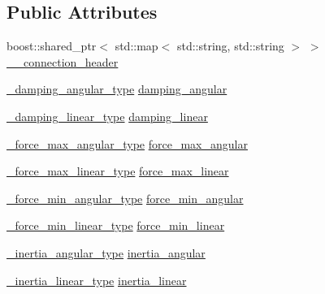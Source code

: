\subsection*{Public Attributes}
\begin{DoxyCompactItemize}
\item 
boost\+::shared\+\_\+ptr$<$ std\+::map$<$ std\+::string, std\+::string $>$ $>$ \hyperlink{structjaco__msgs_1_1SetForceControlParamsRequest___a5fbf5d5d93bc38b2dcaf78f0cc37718e}{\+\_\+\+\_\+connection\+\_\+header}
\item 
\hyperlink{structjaco__msgs_1_1SetForceControlParamsRequest___a237f71deae909129820dbba65df1a9ab}{\+\_\+damping\+\_\+angular\+\_\+type} \hyperlink{structjaco__msgs_1_1SetForceControlParamsRequest___aad2dc5a6c218abdb8723023e6ea7aa40}{damping\+\_\+angular}
\item 
\hyperlink{structjaco__msgs_1_1SetForceControlParamsRequest___adc25193330852db72172327eabad17a8}{\+\_\+damping\+\_\+linear\+\_\+type} \hyperlink{structjaco__msgs_1_1SetForceControlParamsRequest___a8512d209d48fdb9db5ada5584e41033b}{damping\+\_\+linear}
\item 
\hyperlink{structjaco__msgs_1_1SetForceControlParamsRequest___adcfd9cb3d8af6d83169e04fd708d9e43}{\+\_\+force\+\_\+max\+\_\+angular\+\_\+type} \hyperlink{structjaco__msgs_1_1SetForceControlParamsRequest___afa6dc239b7bd0cd6b43b4ccea1ec92af}{force\+\_\+max\+\_\+angular}
\item 
\hyperlink{structjaco__msgs_1_1SetForceControlParamsRequest___a8f99b85942145effd0d125e03c36c3b2}{\+\_\+force\+\_\+max\+\_\+linear\+\_\+type} \hyperlink{structjaco__msgs_1_1SetForceControlParamsRequest___a89805bac05f838a5bc70a641539715f0}{force\+\_\+max\+\_\+linear}
\item 
\hyperlink{structjaco__msgs_1_1SetForceControlParamsRequest___a3c572a2972a591dc6d8ac2e7490919e8}{\+\_\+force\+\_\+min\+\_\+angular\+\_\+type} \hyperlink{structjaco__msgs_1_1SetForceControlParamsRequest___ab84d0d8b19f11eca2319c4ef903caafd}{force\+\_\+min\+\_\+angular}
\item 
\hyperlink{structjaco__msgs_1_1SetForceControlParamsRequest___aaaf1a2020f17e7b8ff8e0b368f511353}{\+\_\+force\+\_\+min\+\_\+linear\+\_\+type} \hyperlink{structjaco__msgs_1_1SetForceControlParamsRequest___a6acec93f53a7132d740aa0335a05a36d}{force\+\_\+min\+\_\+linear}
\item 
\hyperlink{structjaco__msgs_1_1SetForceControlParamsRequest___a6f395e799c9b87fa1ed44f2639681860}{\+\_\+inertia\+\_\+angular\+\_\+type} \hyperlink{structjaco__msgs_1_1SetForceControlParamsRequest___aee7ba36455fcb2b5ea168a5bf6331b7b}{inertia\+\_\+angular}
\item 
\hyperlink{structjaco__msgs_1_1SetForceControlParamsRequest___a72df435d24614736e733258c4a1b8919}{\+\_\+inertia\+\_\+linear\+\_\+type} \hyperlink{structjaco__msgs_1_1SetForceControlParamsRequest___a1163bd5470638964c3bd0f3146617695}{inertia\+\_\+linear}
\end{DoxyCompactItemize}


